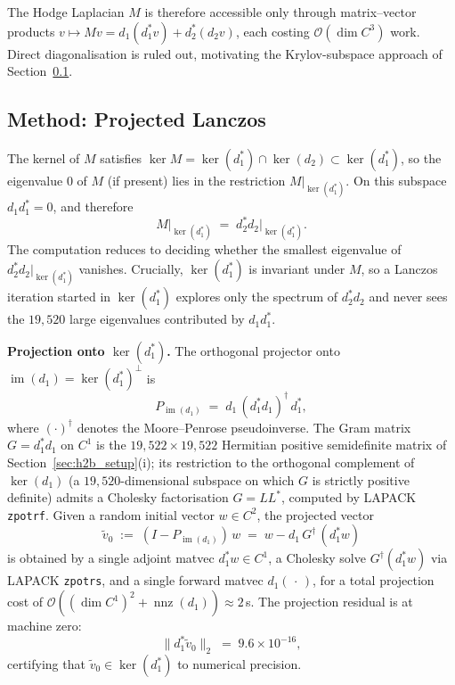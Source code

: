 The Hodge Laplacian $M$ is therefore accessible only through matrix--vector products $v \mapsto Mv = d_1(d_1^* v) + d_2^*(d_2 v)$, each costing $\mathcal{O}(\dim C^3)$ work. Direct diagonalisation is ruled out, motivating the Krylov-subspace approach of Section~\ref{sec:h2b_method}.

\subsection{Method: Projected Lanczos}
\label{sec:h2b_method}

The kernel of $M$ satisfies $\ker M = \ker(d_1^*) \cap \ker(d_2) \subset \ker(d_1^*)$, so the eigenvalue $0$ of $M$ (if present) lies in the restriction $M|_{\ker(d_1^*)}$. On this subspace $d_1 d_1^* = 0$, and therefore
\[
M\big|_{\ker(d_1^*)} \;=\; d_2^* d_2\big|_{\ker(d_1^*)}.
\]
The computation reduces to deciding whether the smallest eigenvalue of $d_2^* d_2|_{\ker(d_1^*)}$ vanishes. Crucially, $\ker(d_1^*)$ is invariant under $M$, so a Lanczos iteration started in $\ker(d_1^*)$ explores only the spectrum of $d_2^* d_2$ and never sees the $19{,}520$ large eigenvalues contributed by $d_1 d_1^*$.

\medskip\noindent\textbf{Projection onto $\ker(d_1^*)$.} The orthogonal projector onto $\operatorname{im}(d_1) = \ker(d_1^*)^\perp$ is
\[
P_{\operatorname{im}(d_1)} \;=\; d_1\, (d_1^* d_1)^{\dagger}\, d_1^*,
\]
where $(\cdot)^{\dagger}$ denotes the Moore--Penrose pseudoinverse. The Gram matrix $G = d_1^* d_1$ on $C^1$ is the $19{,}522 \times 19{,}522$ Hermitian positive semidefinite matrix of Section~\ref{sec:h2b_setup}(i); its restriction to the orthogonal complement of $\ker(d_1)$ (a $19{,}520$-dimensional subspace on which $G$ is strictly positive definite) admits a Cholesky factorisation $G = L L^*$, computed by LAPACK \texttt{zpotrf}. Given a random initial vector $w \in C^2$, the projected vector
\[
\tilde{v}_0 \;:=\; (I - P_{\operatorname{im}(d_1)})\, w \;=\; w - d_1\, G^{\dagger}\, (d_1^* w)
\]
is obtained by a single adjoint matvec $d_1^* w \in C^1$, a Cholesky solve $G^{\dagger}(d_1^* w)$ via LAPACK \texttt{zpotrs}, and a single forward matvec $d_1(\,\cdot\,)$, for a total projection cost of $\mathcal{O}((\dim C^1)^2 + \operatorname{nnz}(d_1)) \approx 2$\,s. The projection residual is at machine zero:
\[
\|d_1^* \tilde{v}_0\|_2 \;=\; 9.6 \times 10^{-16},
\]
certifying that $\tilde{v}_0 \in \ker(d_1^*)$ to numerical precision.

